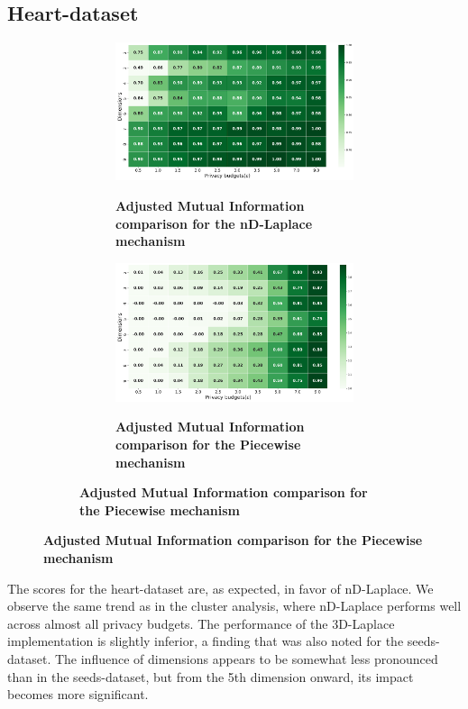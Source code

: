 \subsection{Heart-dataset}
\begin{figure}[H]
  \centering
  \begin{subfigure}[b]{0.80\textwidth}
    \begin{subfigure}[c]{1\textwidth}
      \caption{\textbf{Adjusted Mutual Information comparison for the nD-Laplace mechanism}}
      \includegraphics[width=1\textwidth]{Results/nd-laplace/nd-Laplace/heart-dataset/ami.png}
      \label{fig:ami_heart-dataset_comparison_kdlaplace_2d}
    \end{subfigure}
    \vfill %
    \begin{subfigure}[c]{1\textwidth}
      \caption{\textbf{Adjusted Mutual Information comparison for the Piecewise mechanism}}
      \includegraphics[width=1\textwidth]{Results/nd-laplace/piecewise/heart-dataset/ami.png}
      \label{fig:ami_heart-dataset_comparison_piecewise_2d}
    \end{subfigure}
  \end{subfigure}
\end{figure}
The scores for the heart-dataset are, as expected, in favor of nD-Laplace. We observe the same trend as in the cluster analysis, where nD-Laplace performs well across almost all privacy budgets. The performance of the 3D-Laplace implementation is slightly inferior, a finding that was also noted for the seeds-dataset. The influence of dimensions appears to be somewhat less pronounced than in the seeds-dataset, but from the 5th dimension onward, its impact becomes more significant.

